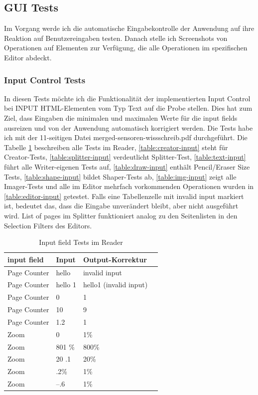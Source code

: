 \subsection{GUI Tests}
Im Vorgang werde ich die automatische Eingabekontrolle der Anwendung auf ihre Reaktion auf Benutzereingaben testen. Danach stelle ich Screenshots von Operationen auf Elementen zur Verfügung, die alle Operationen im spezifischen Editor abdeckt.

\subsubsection{Input Control Tests}
In diesen Tests möchte ich die Funktionalität der implementierten Input Control bei INPUT HTML-Elementen vom Typ Text auf die Probe stellen. Dies hat zum Ziel, dass Eingaben die minimalen und maximalen Werte für die input fields ausreizen und von der Anwendung automatisch korrigiert werden. Die Tests habe ich mit der 11-seitigen Datei merged-sensoren-wissschreib.pdf durchgeführt. Die Tabelle \ref{table:reader-input} beschreiben alle Tests im Reader, \ref{table:creator-input} steht für Creator-Tests, \ref{table:splitter-input} verdeutlicht Splitter-Test, \ref{table:text-input} führt alle Writer-eigenen Tests auf, \ref{table:draw-input} enthält Pencil/Eraser Size Tests, \ref{table:shape-input} bildet Shaper-Tests ab, \ref{table:img-input} zeigt alle Imager-Tests und alle im Editor mehrfach vorkommenden Operationen wurden in \ref{table:editor-input} getestet. Falls eine Tabellenzelle mit invalid input markiert ist, bedeutet das, dass die Eingabe unverändert bleibt, aber nicht ausgeführt wird. List of pages im Splitter funktioniert analog zu den Seitenlisten in den Selection Filters des Editors.

\begin{table}[!htbp]
	\centering
	\begin{tabular}{|p{4cm}|p{3cm}|p{3cm}|p{3cm}|}
		\hline
		\textbf{input field}				& \textbf{Input} 	& \textbf{Output-Korrektur}	\\ 
		\hline
		Page Counter						& hello 			& invalid input				\\
		Page Counter						& hello 1			& hello1 (invalid input)	\\
		Page Counter						& 0 				& 1							\\ 
		Page Counter						& 10 				& 9 						\\ 
		Page Counter						& 1.2 				& 1 						\\ 
		Zoom 								& 0					& 1\%  						\\
		Zoom 								& 801 \% 			& 800\% 					\\ 
		Zoom 								& 20 .1 			& 20\% 						\\ 
		Zoom 								& .2\% 				& 1\% 					\\ 
		Zoom 								& –.6 				& 1\% 						\\ 
		\hline
	\end{tabular}
	\caption{Input field Tests im Reader}
	\label{table:reader-input}
\end{table}	

